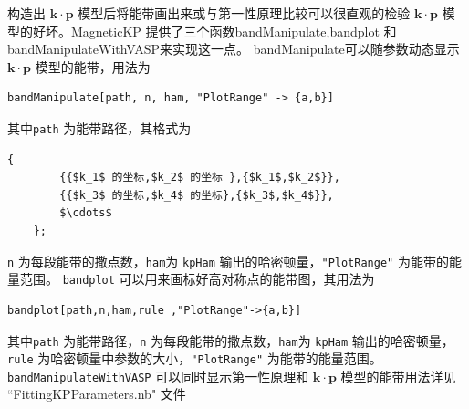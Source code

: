 \documentclass[titlepage,a4paper,12pt,AutoFakeBold]{article}
\begin{document}
构造出  $\boldsymbol{k}\cdot\boldsymbol{p}$ 模型后将能带画出来或与第一性原理比较可以很直观的检验  $\boldsymbol{k}\cdot\boldsymbol{p}$ 模型的好坏。\textsf{MagneticKP} 提供了三个函数\textsf{bandManipulate,bandplot 和bandManipulateWithVASP}来实现这一点。
\textsf{bandManipulate}可以随参数动态显示 $\boldsymbol{k}\cdot\boldsymbol{p}$ 模型的能带，用法为
\begin{lstlisting}[backgroundcolor={\color{yellow!5!white}},mathescape=true]
	bandManipulate[path, n, ham, "PlotRange" -> {a,b}]
\end{lstlisting}
其中\lstinline|path| 为能带路径，其格式为
\begin{lstlisting}[backgroundcolor={\color{yellow!5!white}},mathescape=true]
	{
		{{$k_1$ 的坐标,$k_2$ 的坐标 },{$k_1$,$k_2$}},
		{{$k_3$ 的坐标,$k_4$ 的坐标},{$k_3$,$k_4$}},
		$\cdots$
	};\end{lstlisting}
\lstinline|n| 为每段能带的撒点数，\lstinline|ham|为 \lstinline|kpHam| 输出的哈密顿量，\lstinline|"PlotRange"| 为能带的能量范围。
\lstinline|bandplot| 可以用来画标好高对称点的能带图，其用法为
\begin{lstlisting}[backgroundcolor={\color{yellow!5!white}},mathescape=true]
bandplot[path,n,ham,rule ,"PlotRange"->{a,b}]
\end{lstlisting}
其中\lstinline|path| 为能带路径，\lstinline|n| 为每段能带的撒点数，\lstinline|ham|为 \lstinline|kpHam| 输出的哈密顿量，\lstinline|rule| 为哈密顿量中参数的大小，\lstinline|"PlotRange"| 为能带的能量范围。
\lstinline|bandManipulateWithVASP| 可以同时显示第一性原理和  $\boldsymbol{k}\cdot\boldsymbol{p}$ 模型的能带用法详见 ``FittingKPParameters.nb" 文件
\end{document}
